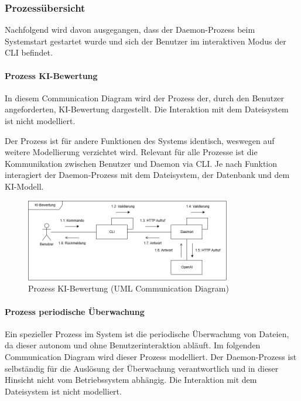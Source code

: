 \documentclass[a4paper,12pt]{report}
\begin{document}
    \subsubsection{Prozessübersicht}
    Nachfolgend wird davon ausgegangen, dass der Daemon-Prozess beim Systemstart gestartet wurde und sich der Benutzer im interaktiven Modus der CLI befindet.

    \paragraph*{Prozess KI-Bewertung}
    In diesem Communication Diagram wird der Prozess der, durch den Benutzer angeforderten, KI-Bewertung dargestellt.
    Die Interaktion mit dem Dateisystem ist nicht modelliert.

    Der Prozess ist für andere Funktionen des Systems identisch, weswegen auf weitere Modellierung verzichtet wird.
    Relevant für alle Prozesse ist die Kommunikation zwischen Benutzer und Daemon via CLI.
    Je nach Funktion interagiert der Daemon-Prozess mit dem Dateisystem, der Datenbank und dem KI-Modell.

    \begin{figure}[h]
        \centering
        \includegraphics[width=0.8\textwidth]{assets/communication}
        \caption{Prozess KI-Bewertung (UML Communication Diagram)}
        \label{fig:communication}
    \end{figure}
    \clearpage

    \paragraph*{Prozess periodische Überwachung}
    Ein spezieller Prozess im System ist die periodische Überwachung von Dateien, da dieser autonom und ohne Benutzerinteraktion abläuft.
    Im folgenden Communication Diagram wird dieser Prozess modelliert.
    Der Daemon-Prozess ist selbständig für die Auslösung der Überwachung verantwortlich und in dieser Hinsicht nicht vom Betriebssystem abhängig.
    Die Interaktion mit dem Dateisystem ist nicht modelliert.
\end{document}
